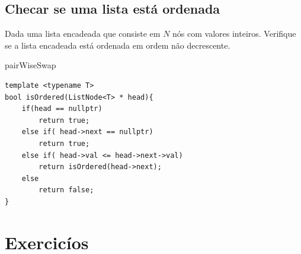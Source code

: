\subsection{Checar se uma lista está ordenada}

Dada uma lista encadeada que consiste em $N$ nós com valores inteiros. Verifique se a lista encadeada está ordenada em ordem não decrescente.

\newpage 

\begin{listing}[!ht]
\caption{pairWiseSwap}

\begin{verbatim}
template <typename T>
bool isOrdered(ListNode<T> * head){
    if(head == nullptr) 
        return true;
    else if( head->next == nullptr) 
        return true;
    else if( head->val <= head->next->val)
        return isOrdered(head->next);
    else
        return false;
}
\end{verbatim}
\end{listing}


\section{Exercicíos}


